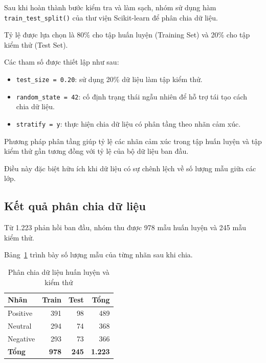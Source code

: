 Sau khi hoàn thành bước kiểm tra và làm sạch, nhóm sử dụng hàm \texttt{train\_test\_split()} của thư viện Scikit-learn để phân chia dữ liệu.

Tỷ lệ được lựa chọn là 80\% cho tập huấn luyện (Training Set) và 20\% cho tập kiểm thử (Test Set).

Các tham số được thiết lập như sau:

\begin{itemize}
    \item \texttt{test\_size = 0.20}: sử dụng 20\% dữ liệu làm tập kiểm thử.

    \item \texttt{random\_state = 42}: cố định trạng thái ngẫu nhiên để hỗ trợ tái tạo cách chia dữ liệu.

    \item \texttt{stratify = y}: thực hiện chia dữ liệu có phân tầng theo nhãn cảm xúc.
\end{itemize}

Phương pháp phân tầng giúp tỷ lệ các nhãn cảm xúc trong tập huấn luyện và tập kiểm thử gần tương đồng với tỷ lệ của bộ dữ liệu ban đầu.

Điều này đặc biệt hữu ích khi dữ liệu có sự chênh lệch về số lượng mẫu giữa các lớp.

\subsection{Kết quả phân chia dữ liệu}

Từ 1.223 phản hồi ban đầu, nhóm thu được 978 mẫu huấn luyện và 245 mẫu kiểm thử.

Bảng~\ref{tab:chia-train-test} trình bày số lượng mẫu của từng nhãn sau khi chia.

\begin{table}[H]
\centering
\caption{Phân chia dữ liệu huấn luyện và kiểm thử}
\label{tab:chia-train-test}
\renewcommand{\arraystretch}{1.15}

\begin{tabular}{|l|r|r|r|}
\hline
\textbf{Nhãn}
& \textbf{Train}
& \textbf{Test}
& \textbf{Tổng} \\
\hline

Positive & 391 & 98 & 489 \\
\hline

Neutral & 294 & 74 & 368 \\
\hline

Negative & 293 & 73 & 366 \\
\hline

\textbf{Tổng}
& \textbf{978}
& \textbf{245}
& \textbf{1.223} \\
\hline

\end{tabular}
\end{table}

